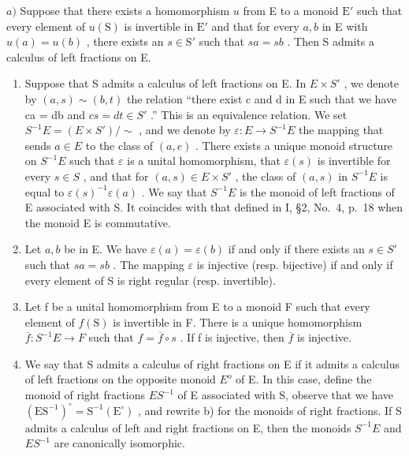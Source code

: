 \(a)\) Suppose that there exists a homomorphism \(u\) from E to a monoid \(\mathrm{E}'\) such that every element of \(u(\mathrm{S})\) is invertible in \(\mathrm{E}'\) and that for every \(a, b\) in E with \(u(a) = u(b)\) , there exists an \(s \in \mathrm{S}'\) such that \(sa = sb\) . Then S admits a calculus of left fractions on E.

\begin{enumerate}
\def\labelenumi{\alph{enumi})}
\setcounter{enumi}{1}
\item
  Suppose that S admits a calculus of left fractions on E. In \(E \times S'\) , we denote by \((a, s) \sim (b, t)\) the relation ``there exist c and d in E such that we have ca = db and \(cs = dt \in S'\) .'' This is an equivalence relation. We set \(S^{-1}E = (E \times S') / \sim\) , and we denote by \(\varepsilon : E \to S^{-1}E\) the mapping that sends \(a \in E\) to the class of \((a, e)\) . There exists a unique monoid structure on \(S^{-1}E\) such that \(\varepsilon\) is a unital homomorphism, that \(\varepsilon(s)\) is invertible for every \(s \in S\) , and that for \((a, s) \in E \times S'\) , the class of \((a, s)\) in \(S^{-1}E\) is equal to \(\varepsilon(s)^{-1}\varepsilon(a)\) . We say that \(S^{-1}E\) is the monoid of left fractions of E associated with S. It coincides with that defined in I, §2, No.~4, p.~18 when the monoid E is commutative.
\item
  Let \(a, b\) be in E. We have \(\varepsilon(a) = \varepsilon(b)\) if and only if there exists an \(s \in S'\) such that \(sa = sb\) . The mapping \(\varepsilon\) is injective (resp. bijective) if and only if every element of S is right regular (resp. invertible).
\item
  Let f be a unital homomorphism from E to a monoid F such that every element of \(f(\mathrm{S})\) is invertible in F. There is a unique homomorphism \(\overline{f}: S^{-1}E \to F\) such that \(f = \overline{f} \circ s\) . If f is injective, then \(\overline{f}\) is injective.
\item
  We say that S admits a calculus of right fractions on E if it admits a calculus of left fractions on the opposite monoid \(E^{o}\) of E. In this case, define the monoid of right fractions \(ES^{-1}\) of E associated with S, observe that we have \((\mathrm{ES}^{-1})^{\circ} = \mathrm{S}^{-1}(\mathrm{E}^{\circ})\) , and rewrite b) for the monoids of right fractions. If S admits a calculus of left and right fractions on E, then the monoids \(S^{-1}E\) and \(ES^{-1}\) are canonically isomorphic.
\end{enumerate}

